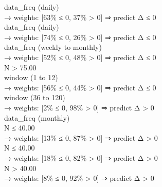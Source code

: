 \begin{flushleft}
\quad \quad \quad data\_freq (daily) \\
\quad \quad \quad \quad → weights: [63\% ≤ 0, 37\% > 0] ⇒ predict Δ ≤ 0 \\
\quad \quad \quad data\_freq (daily) \\
\quad \quad \quad \quad → weights: [74\% ≤ 0, 26\% > 0] ⇒ predict Δ ≤ 0 \\
\quad \quad \quad data\_freq (weekly to monthly) \\
\quad \quad \quad \quad → weights: [52\% ≤ 0, 48\% > 0] ⇒ predict Δ ≤ 0 \\
\quad \quad N > 75.00 \\
\quad \quad \quad window (1 to 12) \\
\quad \quad \quad \quad → weights: [56\% ≤ 0, 44\% > 0] ⇒ predict Δ ≤ 0 \\
\quad \quad \quad window (36 to 120) \\
\quad \quad \quad \quad → weights: [2\% ≤ 0, 98\% > 0] ⇒ predict Δ > 0 \\
\quad data\_freq (monthly) \\
\quad \quad N ≤ 40.00 \\
\quad \quad \quad \quad → weights: [13\% ≤ 0, 87\% > 0] ⇒ predict Δ > 0 \\
\quad \quad N ≤ 40.00 \\
\quad \quad \quad \quad → weights: [18\% ≤ 0, 82\% > 0] ⇒ predict Δ > 0 \\
\quad \quad N > 40.00 \\
\quad \quad \quad \quad → weights: [8\% ≤ 0, 92\% > 0] ⇒ predict Δ > 0 \\
\end{flushleft}
